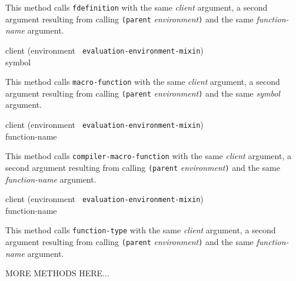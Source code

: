 This method calls \texttt{fdefinition} with the same \textit{client}
argument, a second argument resulting from calling \texttt{(parent}
\textit{environment}\texttt{)} and the same \textit{function-name}
argument.

{\small{} {client (environment {\tt
      evaluation-environment-mixin}) \\ symbol}
}

This method calls \texttt{macro-function} with the same
\textit{client} argument, a second argument resulting from calling
\texttt{(parent} \textit{environment}\texttt{)} and the same
\textit{symbol} argument.

{\small{} {client (environment {\tt
      evaluation-environment-mixin}) \\ function-name}
}

This method calls \texttt{compiler-macro-function} with the same
\textit{client} argument, a second argument resulting from calling
\texttt{(parent} \textit{environment}\texttt{)} and the same
  \textit{function-name} argument.

{\small{} {client (environment {\tt
      evaluation-environment-mixin}) \\ function-name}
}

This method calls \texttt{function-type} with the same \textit{client}
argument, a second argument resulting from calling \texttt{(parent}
\textit{environment}\texttt{)} and the same \textit{function-name}
argument.

MORE METHODS HERE...
